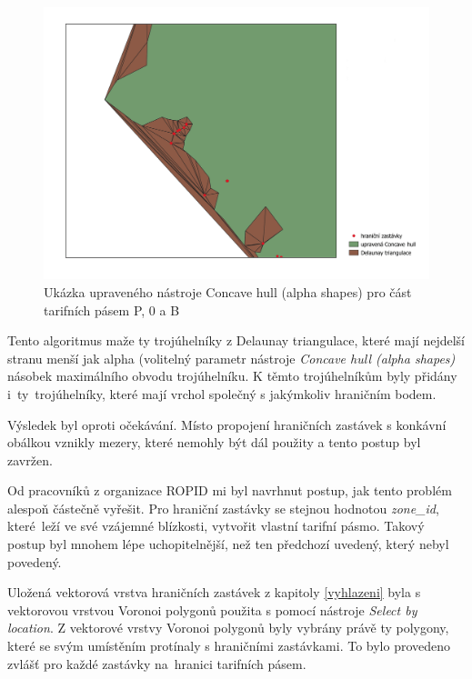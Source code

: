 \begin{figure}[H] \centering
    \includegraphics[width=400pt]{./pictures/concave_hull_upravena.png}
    \caption[Ukázka upraveného nástroje Concave hull (alpha shapes) pro část tarifních pásem P, 0 a B]{Ukázka upraveného nástroje Concave hull (alpha shapes)  pro část tarifních pásem P, 0 a B}
	\label{fig:concave_hull_upravena}              
\end{figure}

Tento algoritmus maže ty trojúhelníky z Delaunay triangulace, které mají nej\-delší stranu menší jak alpha (volitelný
parametr nástroje \textit{Concave hull (alpha sha\-pes)} násobek maximálního obvodu trojúhelníku.
K těmto trojúhelníkům byly přidá\-ny i~ty~trojúhelníky, které mají vrchol společný s jakýmkoliv hraničním bodem.

Výsledek byl oproti očekávání. Místo propojení hraničních zastávek s konkávní obálkou vznikly mezery, 
které nemohly být dál použity a tento postup byl zavržen.

Od pracovníků z organizace ROPID mi byl navrhnut postup, jak tento problém alespoň částečně vyřešit. Pro hraniční zastávky se stejnou hodnotou \textit{zone\_id}, 
které~leží ve své vzájemné blízkosti, vytvořit vlastní tarifní pásmo. Takový postup byl mnohem lépe uchopitelnější, než ten předchozí uvedený, který nebyl povedený.

Uložená vektorová vrstva hraničních zastávek z kapitoly \ref{vyhlazeni} byla s vektorovou vrstvou Voronoi polygonů
použita s pomocí nástroje \textit{Select by location}. Z vektorové vrstvy Voronoi polygonů byly vybrány právě ty polygony,
které se svým umístěním protínaly s hraničními zastávkami. To bylo provedeno zvlášť pro každé zastávky na~hranici tarifních pásem.

